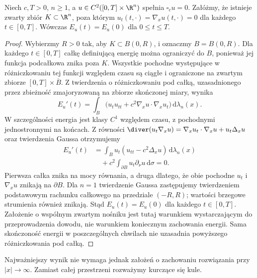 \begin{twierdzenie}\label{thm:pde5-energy}
Niech $c,T>0$, $n\ge1$, a $u\in C^2([0,T]\times\R^n)$
spełnia $\square_cu=0$. Załóżmy, że istnieje
zwarty zbiór $K\subset\R^n$, poza którym
$u_t(t,\cdot)=\nabla_xu(t,\cdot)=0$
dla każdego $t\in[0,T]$. Wówczas $E_u(t)=E_u(0)$
dla $0\leq t\leq T$.
\end{twierdzenie}
\begin{proof}
Wybierzmy $R>0$ tak, aby $K\subset B(0,R)$,
i oznaczmy $B=B(0,R)$.
Dla każdego $t\in[0,T]$ całkę definiującą energię
można ograniczyć do $B$, ponieważ jej funkcja
podcałkowa znika poza $K$.
Wszystkie pochodne występujące w różniczkowaniu
tej funkcji względem czasu są ciągłe i ograniczone
na zwartym zbiorze $[0,T]\times\overline B$.
Z twierdzenia o różniczkowaniu pod całką,
uzasadnionego przez zbieżność zmajoryzowaną na
zbiorze skończonej miary, wynika
\[
 E_u'(t)=\int_B
 \bigl(u_tu_{tt}+c^2\nabla_xu\cdot\nabla_xu_t\bigr)
 \,\mathrm d\lambda_n(x).
\]
W szczególności energia jest klasy $C^1$ względem
czasu, z pochodnymi jednostronnymi na końcach.
Z równości
$\diver(u_t\nabla_xu)=\nabla_xu_t\cdot\nabla_xu+
u_t\Delta_xu$ oraz twierdzenia Gaussa otrzymujemy
\[
 \begin{aligned}
 E_u'(t)
 &=\int_B u_t(u_{tt}-c^2\Delta_xu)
      \,\mathrm d\lambda_n(x)\\
 &\quad+c^2\int_{\partial B}u_t\partial_\nu u
      \,\mathrm d\sigma=0.
 \end{aligned}
\]
Pierwsza całka znika na mocy równania, a druga
dlatego, że obie pochodne $u_t$ i $\nabla_xu$
znikają na $\partial B$.
Dla $n=1$ twierdzenie Gaussa zastępujemy
twierdzeniem podstawowym rachunku całkowego na
przedziale $(-R,R)$; wartości brzegowe strumienia
również znikają. Stąd $E_u(t)=E_u(0)$ dla każdego
$t\in[0,T]$.
Założenie o wspólnym zwartym nośniku jest tutaj
warunkiem wystarczającym do przeprowadzenia dowodu,
nie warunkiem koniecznym zachowania energii.
Sama skończoność energii w poszczególnych chwilach
nie uzasadnia powyższego różniczkowania pod całką.
\end{proof}

Najważniejszy wynik nie wymaga jednak założeń o zachowaniu
rozwiązania przy $|x|\to\infty$. Zamiast całej przestrzeni
rozważymy kurczące się kule.

